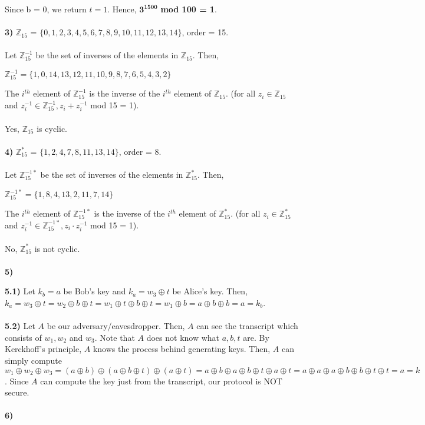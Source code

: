 \documentclass[12pt]{article}
\begin{document}
\noindent Since b = 0, we return $t = 1$. Hence, $\mathbf{3^{1500}}$ \textbf{mod 100 = 1}.
\\
\\
\noindent \textbf{3)} $\mathbb{Z}_{15}$ = $\{0,1,2,3,4,5,6,7,8,9,10,11,12,13,14\}$, order = 15.
\\
\\
\noindent Let $\mathbb{Z}_{15}^{-1}$ be the set of inverses of the elements in $\mathbb{Z}_{15}$. Then, 
\begin{center}
$\mathbb{Z}_{15}^{-1}=\{1,0,14,13,12,11,10,9,8,7,6,5,4,3,2\}$
\end{center}
The $i^{th}$ element of $\mathbb{Z}_{15}^{-1}$ is the inverse of the $i^{th}$ element of $\mathbb{Z}_{15}$. (for all $z_i \in \mathbb{Z}_{15}$ and $z_i^{-1} \in \mathbb{Z}_{15}^{-1}, z_i + z_i^{-1}$ mod 15 = 1).
\\
\\
Yes, $\mathbb{Z}_{15}$ is cyclic.
\\
\\
\noindent \textbf{4)} $\mathbb{Z}_{15}^*$ = $\{1,2,4,7,8,11,13,14\}$, order = 8.
\\
\\
\noindent Let $\mathbb{Z}_{15}^{-1*}$ be the set of inverses of the elements in $\mathbb{Z}_{15}^*$. Then, 
\begin{center}
$\mathbb{Z}_{15}^{-1*}=\{1,8,4,13,2,11,7,14\}$
\end{center}
The $i^{th}$ element of $\mathbb{Z}_{15}^{-1*}$ is the inverse of the $i^{th}$ element of $\mathbb{Z}_{15}^*$. (for all $z_i \in \mathbb{Z}_{15}^*$ and $z_i^{-1} \in \mathbb{Z}_{15}^{-1*}, z_i \cdot z_i^{-1}$ mod 15 = 1).
\\
\\
No, $\mathbb{Z}_{15}^*$ is not cyclic.
\\
\\
\noindent \textbf{5)} 

\noindent \textbf{5.1)} Let $k_b = a$ be Bob's key and $k_a = w_3 \oplus t$ be Alice's key. Then, $k_a = w_3 \oplus t = w_2 \oplus b \oplus t = w_1 \oplus t \oplus b \oplus t = w_1 \oplus b = a \oplus b \oplus b = a = k_b$.
\\
\\
\noindent \textbf{5.2)} Let $A$ be our adversary/eavesdropper. Then, $A$ can see the transcript which consists of $w_1, w_2$ and $w_3$. Note that $A$ does not know what $a,b,t$ are. By Kerckhoff's principle, $A$ knows the process behind generating keys. Then, $A$ can simply compute $w_1 \oplus w_2 \oplus w_3 = (a \oplus b) \oplus (a \oplus b \oplus t) \oplus (a \oplus t) = a \oplus b \oplus a \oplus b \oplus t \oplus a \oplus t = a \oplus a \oplus a \oplus b \oplus b \oplus t \oplus t = a = k$. Since $A$ can compute the key just from the transcript, our protocol is NOT secure.
\\
\\
\noindent \textbf{6)} 
\end{document}
